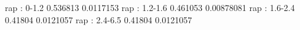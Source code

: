 rap : 0-1.2
0.536813 0.0117153
rap : 1.2-1.6
0.461053 0.00878081
rap : 1.6-2.4
0.41804 0.0121057
rap : 2.4-6.5
0.41804 0.0121057
